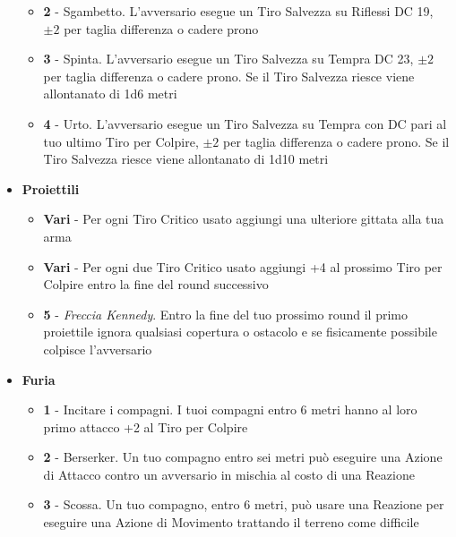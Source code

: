 \begin{multicols}{2}
\begin{itemize}[leftmargin=*]
\begin{itemize}[leftmargin=*]
		\item \textbf{2} - Sgambetto. L'avversario esegue un Tiro Salvezza su Riflessi DC 19, $ \pm 2 $ per taglia differenza o cadere prono
		
		\item \textbf{3} - Spinta. L'avversario esegue un Tiro Salvezza su Tempra DC 23, $ \pm 2 $ per taglia differenza o cadere prono. Se il Tiro Salvezza riesce viene allontanato di 1d6 metri
		
		\item \textbf{4} - Urto. L'avversario esegue un Tiro Salvezza su Tempra con DC pari al tuo ultimo Tiro per Colpire, $ \pm 2 $ per taglia differenza o cadere prono. Se il Tiro Salvezza riesce viene allontanato di 1d10 metri
	\end{itemize}
	
	\item \textbf{Proiettili}
	\begin{itemize}[leftmargin=*]
		\setlength{\itemsep}{0pt}
		\item \textbf{Vari} - Per ogni Tiro Critico usato aggiungi una ulteriore gittata alla tua arma
		
		\item \textbf{Vari} - Per ogni due Tiro Critico usato aggiungi +4 al prossimo Tiro per Colpire entro la fine del round successivo
		
		\item \textbf{5} - \emph{Freccia Kennedy}. Entro la fine del tuo prossimo round il primo proiettile ignora qualsiasi copertura o ostacolo e se fisicamente possibile colpisce l'avversario
	\end{itemize}
	
	\item \textbf{Furia}
	\begin{itemize}[leftmargin=*]
		\setlength{\itemsep}{0pt}
		\item \textbf{1} - Incitare i compagni. I tuoi compagni entro 6 metri hanno al loro primo attacco +2 al Tiro per Colpire
		
		\item \textbf{2} - Berserker. Un tuo compagno entro sei metri può eseguire una Azione di Attacco contro un avversario in mischia al costo di una Reazione
		
		\item \textbf{3} - Scossa. Un tuo compagno, entro 6 metri, può usare una Reazione per eseguire una Azione di Movimento trattando il terreno come difficile
		

\end{itemize}
\end{itemize}
\end{multicols}
